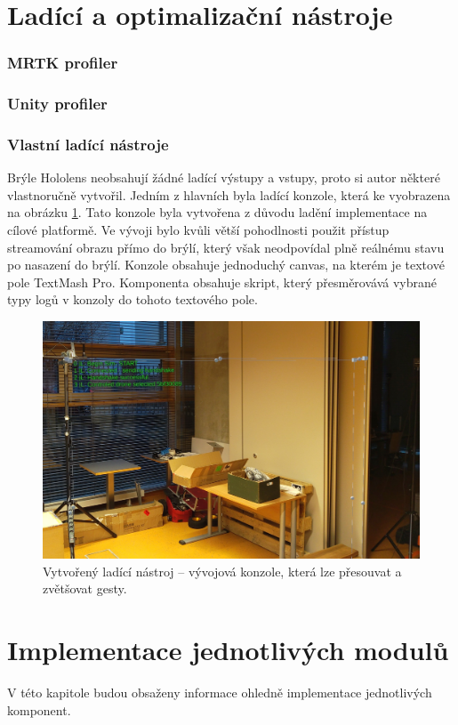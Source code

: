 \section{Ladící a optimalizační nástroje}
\subsubsection{MRTK profiler}
\subsubsection{Unity profiler}
\subsubsection{Vlastní ladící nástroje}
Brýle Hololens neobsahují žádné ladící výstupy a vstupy, proto si autor některé vlastnoručně vytvořil. Jedním z hlavních byla ladící konzole, která ke vyobrazena na obrázku \ref{pic:debugConsole}. Tato konzole byla vytvořena z důvodu ladění implementace na cílové platformě. Ve vývoji bylo kvůli větší pohodlnosti použit přístup streamování obrazu přímo do brýlí, který však neodpovídal plně reálnému stavu po nasazení do brýlí. Konzole obsahuje jednoduchý canvas, na kterém je textové pole TextMash Pro. Komponenta obsahuje skript, který přesměrovává vybrané typy logů v konzoly do tohoto textového pole.
\begin{figure}[H]
    \centering
    \includegraphics[width=1\linewidth]{obrazky-figures//implemetace/debugConsole.jpg}
    \caption{Vytvořený ladící nástroj -- vývojová konzole, která lze přesouvat a zvětšovat gesty.}
    \label{pic:debugConsole}
\end{figure}

\section{Implementace jednotlivých modulů}
V této kapitole budou obsaženy informace ohledně implementace jednotlivých komponent.


